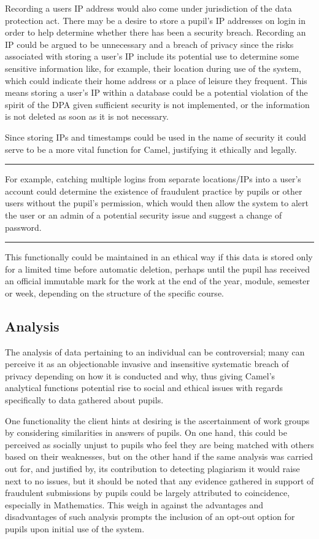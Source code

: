    Recording a users IP address would also come under jurisdiction of the data protection act. There may be a desire to store a pupil's IP addresses on login in order to help determine whether there has been a security breach. Recording an IP could be argued to be unnecessary and a breach of privacy since the risks associated with storing a user’s IP include its potential use to determine some sensitive information like, for example, their location during use of the system, which could indicate their home address or a place of leisure they frequent. This means storing a user’s IP within a database could be a potential violation of the spirit of the DPA given sufficient security is not implemented, or the information is not deleted as soon as it is not necessary.

    Since storing IPs and timestamps could be used in the name of security it could serve to be a more vital function for Camel, justifying it ethically and legally.

	\vspace{0.35cm}
    \hrule
    {\raggedleft \scriptsize For example, catching multiple logins from separate locations/IPs into a user’s account could determine the existence of fraudulent practice by pupils or other users without the pupil’s permission, which would then allow the system to alert the user or an admin of a potential security issue and suggest a change of password.\par}
    \vspace{0.35cm}
    \hrule
    
    This functionally could be maintained in an ethical way if this data is stored only for a limited time before automatic deletion, perhaps until the pupil has received an official immutable mark for the work at the end of the year, module, semester or week, depending on the structure of the specific course.

    \subsection*{Analysis}
    The analysis of data pertaining to an individual can be controversial; many can perceive it as an objectionable invasive and insensitive systematic breach of privacy depending on how it is conducted and why, thus giving Camel’s analytical functions potential rise to social and ethical issues with regards specifically to data gathered about pupils.

    One functionality the client hints at desiring is the ascertainment of work groups by considering similarities in answers of pupils. On one hand, this could be perceived as socially unjust to pupils who feel they are being matched with others based on their weaknesses, but on the other hand if the same analysis was carried out for, and justified by, its contribution to detecting plagiarism it would raise next to no issues, but it should be noted that any evidence gathered in support of fraudulent submissions by pupils could be largely attributed to coincidence, especially in Mathematics. This weigh in against the advantages and disadvantages of such analysis prompts the inclusion of an opt-out option for pupils upon initial use of the system.

